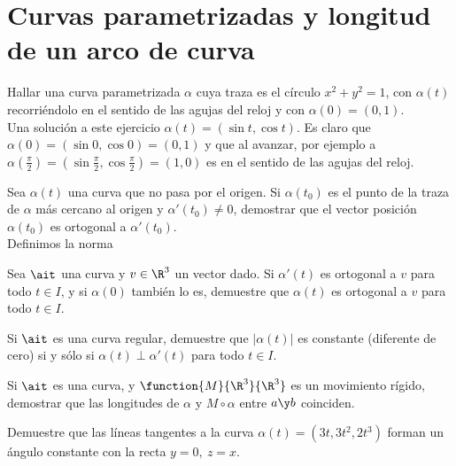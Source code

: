 \chapter{Curvas parametrizadas y longitud de un arco de curva}

\begin{ejercicio} Hallar una curva parametrizada $\alpha$ cuya traza es el círculo $x^2+y^2=1$, con $\alpha(t)$ recorriéndolo en el sentido de las agujas del reloj y con $\alpha(0) =(0,1)$.\\

Una solución a este ejercicio $\alpha(t)=(\sin t, \cos t)$. Es claro que $\alpha(0) =(\sin 0,\cos 0) =(0,1)$ y que al avanzar, por ejemplo a $\alpha(\frac{\pi}{2})=(\sin \frac{\pi}{2},\cos \frac{\pi}{2}) = (1,0)$ es en el sentido de las agujas del reloj.
\end{ejercicio}

\begin{ejercicio} Sea $\alpha(t)$  una curva que no pasa por el origen. Si $\alpha(t_0)$ es el punto de la traza de $\alpha$ más cercano al origen y $\alpha'(t_0)\neq 0$, demostrar que el vector posición $\alpha(t_0)$ es ortogonal a $\alpha'(t_0)$.\\

Definimos la norma
\end{ejercicio}

\begin{ejercicio} Sea $\ait$ una curva y $v\in\R^3$ un vector dado. Si $\alpha'(t)$ es ortogonal a $v$ para todo $t\in I$, y si $\alpha(0)$ también lo es, demuestre que $\alpha(t)$ es ortogonal a $v$ para todo $t\in I$.
\end{ejercicio}

\begin{ejercicio} Si $\ait$ es una curva regular, demuestre que $|\alpha(t)|$ es constante (diferente de cero) si y sólo si $\alpha(t) \perp \alpha'(t)$ para todo $t\in I$.
\end{ejercicio}

\begin{ejercicio} Si $\ait$ es una curva, y $\function{M}{\R^3}{\R^3}$ es un movimiento rígido, demostrar que las longitudes de $\alpha$ y $M\circ\alpha$ entre $a\y b$ coinciden.
\end{ejercicio}

\begin{ejercicio} Demuestre que las líneas tangentes a la curva $\alpha(t)=(3t,3t^2,2t^3)$ forman un ángulo constante con la recta $y=0,\ z=x$.
\end{ejercicio}